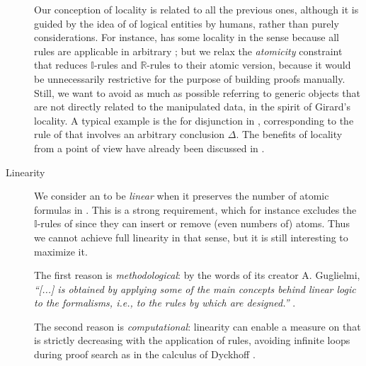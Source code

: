 \begin{scope}
\begin{scope}
\begin{description}
    Our conception of locality is related to all the previous ones, although it
    is guided by the idea of  of logical entities by
    humans, rather than purely  considerations. For
    instance,  has some locality in the  sense because
    all rules are applicable in arbitrary ; but we relax the
    \emph{atomicity} constraint that reduces $\mathbb{I}$-rules and
    $\mathbb{R}$-rules to their atomic version, because it would be
    unnecessarily restrictive for the purpose of building proofs manually.
    Still, we want to avoid as much as possible referring to generic objects
    that are not directly related to the manipulated data, in the spirit of
    Girard's locality. A typical example is the   for disjunction in , corresponding to the
    {\kl{\lor{-}}} rule of  that involves an arbitrary conclusion
    $\Delta$. The benefits of locality from a  point of view have already
    been discussed in .
  \item[Linearity] 
    We consider an  to be \emph{linear} when it preserves the
    number of atomic formulas in . This is a strong requirement,
    which for instance excludes the $\mathbb{I}$-rules of  since they can
    insert or remove (even numbers of) atoms. Thus we cannot achieve full
    linearity in that sense, but it is still interesting to maximize it.
    
    The first reason is \emph{methodological}: by the words of its creator A.
    Guglielmi, \textit{``[...]  is obtained by applying some
    of the main concepts behind linear logic to the formalisms, i.e., to the
    rules by which  are designed.''}
    .
    
    The second reason is \emph{computational}: linearity can enable a measure on
     that is strictly decreasing with the application of rules,
    avoiding infinite loops during proof search as in the calculus  of
    Dyckhoff \cite{dyckhoff_contraction-free_1992}.
    

\end{description}
\end{scope}
\end{scope}
